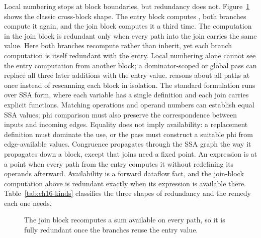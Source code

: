 Local numbering stops at block boundaries, but redundancy does not.
Figure~\ref{fig:ch16-join} shows the classic cross-block shape.
The entry block computes , both branches compute it again, and the join block computes it a third time.
The computation in the join block is redundant only when every path into the join carries the same value.
Here both branches recompute rather than inherit, yet each branch computation is itself redundant with the entry.
Local numbering alone cannot see the entry computation from another block; a dominator-scoped or global pass can replace all three later additions with the entry value.
 reasons about all paths at once instead of rescanning each block in isolation.
The standard formulation runs over SSA form, where each variable has a single definition and each join carries explicit  functions.
Matching operations and operand numbers can establish equal SSA values; phi comparison must also preserve the correspondence between inputs and incoming edges.
Equality does not imply availability: a replacement definition must dominate the use, or the pass must construct a suitable phi from edge-available values.
Congruence propagates through the SSA graph the way it propagates down a block, except that joins need a fixed point.
An expression is  at a point when every path from the entry computes it without redefining its operands afterward.
Availability is a forward dataflow fact, and the join-block computation above is redundant exactly when its expression is available there.
Table~\ref{tab:ch16-kinds} classifies the three shapes of redundancy and the remedy each one needs.

\begin{figure}
  \centering
  \caption{The join block recomputes a sum available on every path, so it is fully redundant once the branches reuse the entry value.}
  \label{fig:ch16-join}
\end{figure}

